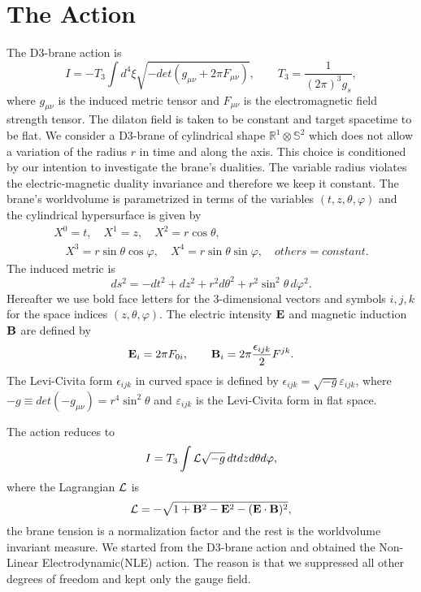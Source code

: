 \documentclass[a4paper,12pt]{article}
\begin{document}
\section{The Action}

\noindent  

The D3-brane action is
\begin{equation}
I=-T_3\int d^4\xi\sqrt{-det(g_{\mu\nu}+2\pi F_{\mu\nu})},\qquad 
T_3=\frac{1}{(2\pi)^3g_s}, 
\label{bi1}
\end{equation}
where $g_{\mu\nu}$ is the induced metric tensor and 
$F_{\mu\nu}$ is the electromagnetic field strength tensor. The dilaton field 
is taken to be constant and target spacetime to be flat. We consider a 
D3-brane of cylindrical shape $\mathbb{R}^1\otimes \mathbb{S}^2$  which does 
not allow a variation of the  radius $r$ in time and along the axis. This 
choice is conditioned by our intention to investigate the brane's dualities.
The variable radius violates the electric-magnetic duality
invariance and therefore we keep it constant. 
The brane's worldvolume is parametrized in terms of the 
variables $(t,z, \theta , \varphi )$ and the cylindrical hypersurface is 
given by
\begin{eqnarray}
X^0=t,\quad X^1=z,\quad X^2=r\cos\theta,\qquad\qquad\qquad\nonumber\\
\quad X^3=r\sin\theta\cos\varphi,\quad X^4=r\sin\theta\sin\varphi,\quad 
others=constant.
\label{bi2}
\end{eqnarray}
The induced metric is
\begin{equation}
ds^2=-dt^2+dz^2+r^2d{\theta}^2+r^2{\sin}^2\theta\,d{\varphi}^2.
\label{bi3}
\end{equation}
Hereafter we use bold face letters for the 3-dimensional vectors and symbols 
$i,j,k$ for the space indices  $(z,\theta ,\varphi )$. The electric 
intensity ${\bf E}$ and magnetic induction ${\bf B}$ are defined by
\begin{equation}
{\bf E}_i=2\pi F_{0i},\qquad {\bf B}_i=2\pi\frac{{\epsilon}_{ijk}}{2}F^{jk}. 
\label{bi4}
\end{equation}
The Levi-Civita form ${\epsilon}_{ijk}$ in curved space is defined by
${\epsilon}_{ijk}=\sqrt{-g}{\varepsilon}_{ijk}$, where 
$-g\equiv det(-g_{\mu\nu})=r^4\sin^2\theta$ and ${\varepsilon}_{ijk}$ is 
the Levi-Civita form in flat space.

\noindent
The action reduces to
\begin{equation}
I=T_3\int {\cal L}\sqrt{-g}\,dtdzd\theta d\varphi,
\label{bi5}
\end{equation}
where the Lagrangian ${\cal L}$ is
\begin{equation}
{\cal L}=-\sqrt{1+{{\bf B}}^2-{{\bf E}}^2-({\bf E} \cdot {\bf B})^2},
\label{bi6}
\end{equation}
the brane tension is a normalization factor and the rest is the worldvolume 
invariant measure. We started from the D3-brane
action and obtained the Non-Linear Electrodynamic(NLE) action. The reason is 
that we suppressed all other degrees of freedom and kept only the gauge field.
\end{document}
